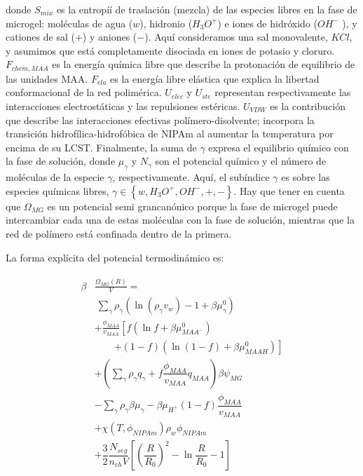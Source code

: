 \noindent donde $S_{mix}$ es la entropí\'i de traslaci\'on (mezcla) de las especies libres en la fase de microgel: mol\'eculas de agua ($w$), hidronio ($H_3O^+$) e iones de hidr\'oxido ($OH^-$ ), y cationes de sal ($+$) y aniones ($-$).
Aqu\'i consideramos una sal monovalente, $KCl$, y asumimos que est\'a completamente disociada en iones de potasio y cloruro.
$F_{chem,MAA}$ es la energ\'ia química libre que describe la protonación de equilibrio de las unidades MAA.
$F_{ela}$ es la energía libre el\'astica que explica la libertad conformacional de la red polim\'erica.
$U_{elec}$ y $U_{ste}$ representan respectivamente las interacciones electrost\'aticas y las repulsiones est\'ericas.
$U_{VDW}$ es la contribuci\'on que describe las interacciones efectivas pol\'imero-disolvente; incorpora la transici\'on hidrofílica-hidrof\'obica de NIPAm al aumentar la temperatura por encima de su LCST.
Finalmente, la suma de $\gamma$ expresa el equilibrio qu\'imico con la fase de soluci\'on, donde $\mu_\gamma$ y $N_\gamma$ son el potencial qu\'imico y el n\'umero de mol\'eculas de la especie $\gamma$, respectivamente.
Aqu\'i, el subíndice $\gamma$ es  sobre las especies qu\'imicas libres, $\gamma \in \left\{ w, H_3O^+, OH^-, +,- \right\}$.
Hay que tener en cuenta que $\Omega_{MG}$ es un potencial semi grancan\'onico porque la fase de microgel puede intercambiar cada una de estas mol\'eculas con la fase de soluci\'on, mientras que la red de pol\'imero está confinada dentro de la primera.

La forma expl\'icita del potencial termodin\'amico es:




%
\begin{align}
\begin{aligned}
\beta&\frac{\Omega_{MG}(R)}{V}=\\& ~ \sum_{\gamma} \rho_\gamma\left(\ln\left(\rho_\gamma v_w\right) -1 + \beta\mu^0_\gamma\right) \\
& + \frac{\phi_{MAA}}{v_{MAA}} \left[f(\ln f+ \beta\mu^0_{MAA^-})\right.\\
&\qquad\left.+(1-f)(\ln (1-f)+\beta\mu^0_{MAAH})\right] \\
%
& +  \left(\sum_{\gamma } {\rho_\gamma q_\gamma + f\dfrac{\phi_{MAA}}{v_{MAA}}q_{MAA}}\right)\beta\psi_{MG}\\
%
& -\sum_{\gamma }{\rho_\gamma\beta\mu_\gamma}
 -\beta\mu_{H^+}(1-f)\dfrac{\phi_{MAA}}{v_{MAA}}\\
%
& + \chi (T, \phi_{NIPAm})\rho_w \phi_{NIPAm} \\
%
& + \dfrac{3}{2}\dfrac{N_{seg}}{n_{ch} V}\left[\left(\dfrac{R}{R_0}\right)^2 - \ln\dfrac{R}{R_0} -1\right]
%
\end{aligned}
\label{eq:free-energy}
\end{align}

